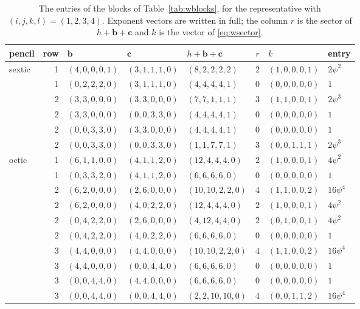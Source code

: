\documentclass[11pt]{amsart}
\theoremstyle{definition}
\theoremstyle{remark}
\newcommand{\bb}{\mathbf{b}}
\newcommand{\cc}{\mathbf{c}}
\begin{document}
\begin{table}[t]
\caption{The entries of the blocks of Table~\ref{tab:wblocks}, for the
representative with $(i,j,k,l)=(1,2,3,4)$. Exponent vectors are written in
full; the column $r$ is the sector of $h+\bb+\cc$ and $k$ is the vector of
\eqref{eq:wsector}.}
\label{tab:wblockdata}
\centering
\footnotesize
\begin{tabular}{lrlllrll}
\toprule
pencil & row & $\bb$ & $\cc$ & $h+\bb+\cc$ & $r$ & $k$ & entry\\
\midrule
sextic & 1 & $(4,0,0,0,1)$ & $(3,1,1,1,0)$ & $(8,2,2,2,2)$ & $2$ & $(1,0,0,0,1)$ & $2\psi^{2}$\\
 & 1 & $(0,2,2,2,0)$ & $(3,1,1,1,0)$ & $(4,4,4,4,1)$ & $0$ & $(0,0,0,0,0)$ & $1$\\
 & 2 & $(3,3,0,0,0)$ & $(3,3,0,0,0)$ & $(7,7,1,1,1)$ & $3$ & $(1,1,0,0,1)$ & $2\psi^{3}$\\
 & 2 & $(3,3,0,0,0)$ & $(0,0,3,3,0)$ & $(4,4,4,4,1)$ & $0$ & $(0,0,0,0,0)$ & $1$\\
 & 2 & $(0,0,3,3,0)$ & $(3,3,0,0,0)$ & $(4,4,4,4,1)$ & $0$ & $(0,0,0,0,0)$ & $1$\\
 & 2 & $(0,0,3,3,0)$ & $(0,0,3,3,0)$ & $(1,1,7,7,1)$ & $3$ & $(0,0,1,1,1)$ & $2\psi^{3}$\\
\midrule
octic & 1 & $(6,1,1,0,0)$ & $(4,1,1,2,0)$ & $(12,4,4,4,0)$ & $2$ & $(1,0,0,0,1)$ & $4\psi^{2}$\\
 & 1 & $(0,3,3,2,0)$ & $(4,1,1,2,0)$ & $(6,6,6,6,0)$ & $0$ & $(0,0,0,0,0)$ & $1$\\
 & 2 & $(6,2,0,0,0)$ & $(2,6,0,0,0)$ & $(10,10,2,2,0)$ & $4$ & $(1,1,0,0,2)$ & $16\psi^{4}$\\
 & 2 & $(6,2,0,0,0)$ & $(4,0,2,2,0)$ & $(12,4,4,4,0)$ & $2$ & $(1,0,0,0,1)$ & $4\psi^{2}$\\
 & 2 & $(0,4,2,2,0)$ & $(2,6,0,0,0)$ & $(4,12,4,4,0)$ & $2$ & $(0,1,0,0,1)$ & $4\psi^{2}$\\
 & 2 & $(0,4,2,2,0)$ & $(4,0,2,2,0)$ & $(6,6,6,6,0)$ & $0$ & $(0,0,0,0,0)$ & $1$\\
 & 3 & $(4,4,0,0,0)$ & $(4,4,0,0,0)$ & $(10,10,2,2,0)$ & $4$ & $(1,1,0,0,2)$ & $16\psi^{4}$\\
 & 3 & $(4,4,0,0,0)$ & $(0,0,4,4,0)$ & $(6,6,6,6,0)$ & $0$ & $(0,0,0,0,0)$ & $1$\\
 & 3 & $(0,0,4,4,0)$ & $(4,4,0,0,0)$ & $(6,6,6,6,0)$ & $0$ & $(0,0,0,0,0)$ & $1$\\
 & 3 & $(0,0,4,4,0)$ & $(0,0,4,4,0)$ & $(2,2,10,10,0)$ & $4$ & $(0,0,1,1,2)$ & $16\psi^{4}$\\

\end{tabular}
\end{table}
\end{document}
